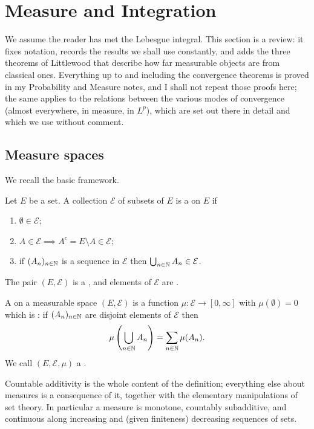 \documentclass[a4paper]{scrartcl}
\begin{document}
\section{Measure and Integration}\label{sec:measure}

We assume the reader has met the Lebesgue integral. This section is a review: it fixes notation, records the results we shall use constantly, and adds the three theorems of Littlewood that describe how far measurable objects are from classical ones. Everything up to and including the convergence theorems is proved in my Probability and Measure notes, and I shall not repeat those proofs here; the same applies to the relations between the various modes of convergence (almost everywhere, in measure, in $L^p$), which are set out there in detail and which we use without comment.

\subsection{Measure spaces}

We recall the basic framework.

\begin{definition}
	Let $E$ be a set. A collection $\mathcal{E}$ of subsets of $E$ is a  on $E$ if
	\begin{enumerate}[label=(\roman*)]
		\item $\emptyset \in \mathcal{E}$;
		\item $A \in \mathcal{E} \implies A^c = E \setminus A \in \mathcal{E}$;
		\item if $(A_n)_{n \in \mathbb{N}}$ is a sequence in $\mathcal{E}$ then $\bigcup_{n \in \mathbb{N}} A_n \in \mathcal{E}$.
	\end{enumerate}
	The pair $(E, \mathcal{E})$ is a , and elements of $\mathcal{E}$ are .
\end{definition}

\begin{definition}[Measure]
	A  on a measurable space $(E, \mathcal{E})$ is a function $\mu : \mathcal{E} \to [0, \infty]$ with $\mu(\emptyset) = 0$ which is : if $(A_n)_{n \in \mathbb{N}}$ are disjoint elements of $\mathcal{E}$ then
	$$\mu\left( \bigcup_{n \in \mathbb{N}} A_n \right) = \sum_{n \in \mathbb{N}} \mu(A_n).$$
	We call $(E, \mathcal{E}, \mu)$ a .
\end{definition}

Countable additivity is the whole content of the definition; everything else about measures is a consequence of it, together with the elementary manipulations of set theory. In particular a measure is monotone, countably subadditive, and continuous along increasing and (given finiteness) decreasing sequences of sets.
\end{document}
